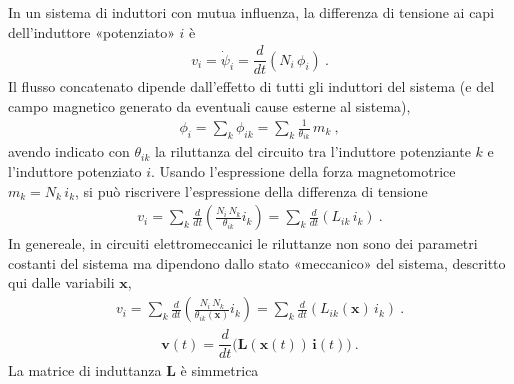 \documentclass[letterpaper,10pt,italian]{jupyterBook}
\begin{document}
\sphinxAtStartPar
In un sistema di induttori con mutua influenza, la differenza di tensione ai capi dell’induttore «potenziato» \(i\) è
\begin{equation*}
\begin{split}v_i = \dot{\psi}_i = \dfrac{d}{dt} \left( N_i \, \phi_i \right) \ .\end{split}
\end{equation*}
\sphinxAtStartPar
Il flusso concatenato dipende dall’effetto di tutti gli induttori del sistema (e del campo magnetico generato da eventuali cause esterne al sistema),
\begin{equation*}
\begin{split}\phi_i = \sum_{k} \phi_{ik} = \sum_{k} \frac{1}{\theta_{ik}} \, m_k \ ,\end{split}
\end{equation*}
\sphinxAtStartPar
avendo indicato con \(\theta_{ik}\) la riluttanza del circuito tra l’induttore potenziante \(k\) e l’induttore potenziato \(i\). Usando l’espressione della forza magneto\sphinxhyphen{}motrice \(m_k = N_k \, i_k\), si può riscrivere l’espressione della differenza di tensione
\begin{equation*}
\begin{split}v_i = \sum_k \frac{d}{dt} \left( \frac{N_i \, N_k}{\theta_{ik}} i_k \right) = \sum_k \frac{d}{dt} \left( L_{ik} \, i_k \right) \ .\end{split}
\end{equation*}
\sphinxAtStartPar
In genereale, in circuiti elettromeccanici le riluttanze non sono dei parametri costanti del sistema ma dipendono dallo stato «meccanico» del sistema, descritto qui dalle variabili \(\mathbf{x}\),
\begin{equation*}
\begin{split}v_i = \sum_k \frac{d}{dt} \left( \frac{N_i \, N_k}{\theta_{ik}(\mathbf{x})} i_k \right) = \sum_k \frac{d}{dt} \left( L_{ik} (\mathbf{x}) \, i_k \right) \ .\end{split}
\end{equation*}\begin{equation*}
\begin{split}\mathbf{v}(t) = \dfrac{d}{dt} \Big( \mathbf{L}(\mathbf{x}(t)) \, \mathbf{i}(t) \Big) \ .\end{split}
\end{equation*}
\sphinxAtStartPar
La matrice di induttanza \(\mathbf{L}\) è simmetrica  
\label{ch/circuits-electromechanic:example-0}
\end{document}
